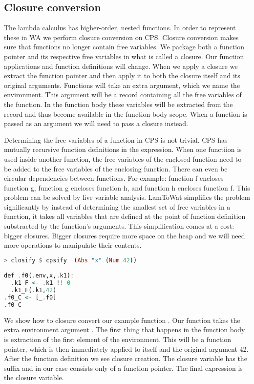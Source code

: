 \subsection{\label{section:closconvert}Closure conversion}
The lambda calculus has higher-order, nested functions. In order to represent these in \ac{WA} we perform closure conversion on \ac{CPS}. Closure conversion makes sure that functions no longer contain free variables. We package both a function pointer and its respective free variables in what is called a closure. Our function applications and function definitions will change. When we apply a closure we extract the function pointer and then apply it to both the closure itself and its original arguments. Functions will take an extra argument, which we name the environment. This argument will be a record containing all the free variables of the function. In the function body these variables will be extracted from the record and thus become available in the function body scope. When a function is passed as an argument we will need to pass a closure instead.

Determining the free variables of a function in \ac{CPS} is not trivial. \ac{CPS} has mutually recursive function definitions in the  expression. When one functiion is used inside another function, the free variables of the enclosed function need to be added to the free variables of the enclosing function. There can even be circular dependencies between functions. For example: function f encloses function g, function g encloses function h, and function h encloses function f. This problem can be solved by live variable analysis\autocite{DBLP:books/aw/AhoSU86}. LamToWat simplifies the problem significantly by instead of determining the smallest set of free variables in a function, it takes all variables that are defined at the point of function definition substracted by the function's arguments. This simplification comes at a cost: bigger closures. Bigger closures require more space on the heap and we will need more operations to manipulate their contents.

\begin{lstlisting}[language=Haskell]
> closify $ cpsify  (Abs "x" (Num 42))

def .f0(.env,x,.k1):
  .k1_F <- .k1 !! 0
  .k1_F(.k1,42)
.f0_C <- [_.f0]
.f0_C
\end{lstlisting}

We show how to closure convert our example function . Our function  takes the extra environment argument . The first thing that happens in the function body is extraction of the first element of the environment. This will be a function pointer, which is then immediately applied to itself and the original argument 42. After the function definition we see closure creation. The closure variable has the  suffix and in our case consists only of a function pointer. The final expression is the closure variable.

